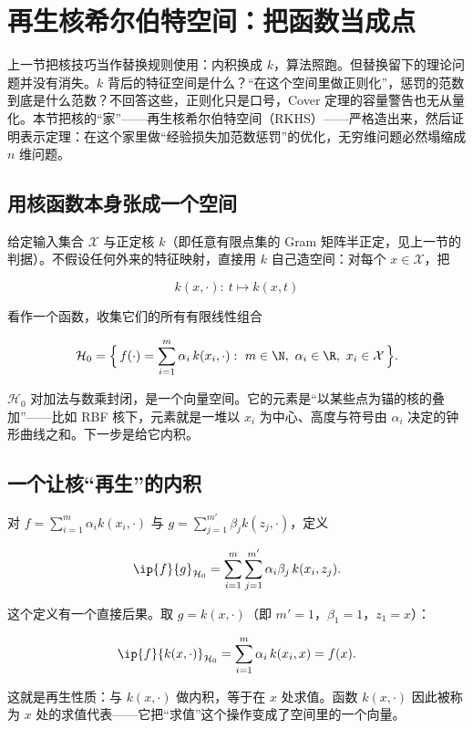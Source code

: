 \section{再生核希尔伯特空间：把函数当成点}

上一节把核技巧当作替换规则使用：内积换成 \(k\)，算法照跑。但替换留下的理论问题并没有消失。\(k\) 背后的特征空间是什么？``在这个空间里做正则化''，惩罚的范数到底是什么范数？不回答这些，正则化只是口号，Cover 定理的容量警告也无从量化。本节把核的``家''——再生核希尔伯特空间（RKHS）——严格造出来，然后证明表示定理：在这个家里做``经验损失加范数惩罚''的优化，无穷维问题必然塌缩成 \(n\) 维问题。

\subsection{用核函数本身张成一个空间}

给定输入集合 \(\mathcal{X}\) 与正定核 \(k\)（即任意有限点集的 Gram 矩阵半正定，见上一节的判据）。不假设任何外来的特征映射，直接用 \(k\) 自己造空间：对每个 \(x\in\mathcal{X}\)，把

\[
k(x,\cdot):\ t\mapsto k(x,t)
\]

看作一个函数，收集它们的所有有限线性组合

\[
\mathcal{H}_0
=\Bigl\{\,f(\cdot)=\sum_{i=1}^{m}\alpha_i\,k(x_i,\cdot):
\ m\in\N,\ \alpha_i\in\R,\ x_i\in\mathcal{X}\,\Bigr\}.
\]

\(\mathcal{H}_0\) 对加法与数乘封闭，是一个向量空间。它的元素是``以某些点为锚的核的叠加''——比如 RBF 核下，元素就是一堆以 \(x_i\) 为中心、高度与符号由 \(\alpha_i\) 决定的钟形曲线之和。下一步是给它内积。

\subsection{一个让核``再生''的内积}

对 \(f=\sum_{i=1}^{m}\alpha_i k(x_i,\cdot)\) 与 \(g=\sum_{j=1}^{m'}\beta_j k(z_j,\cdot)\)，定义

\[
\ip{f}{g}_{\mathcal{H}_0}
=\sum_{i=1}^{m}\sum_{j=1}^{m'}\alpha_i\beta_j\,k(x_i,z_j).
\]

这个定义有一个直接后果。取 \(g=k(x,\cdot)\)（即 \(m'=1\)，\(\beta_1=1\)，\(z_1=x\)）：

\[
\ip{f}{k(x,\cdot)}_{\mathcal{H}_0}
=\sum_{i=1}^{m}\alpha_i\,k(x_i,x)
=f(x).
\]

这就是再生性质：与 \(k(x,\cdot)\) 做内积，等于在 \(x\) 处求值。函数 \(k(x,\cdot)\) 因此被称为 \(x\) 处的求值代表——它把``求值''这个操作变成了空间里的一个向量。

